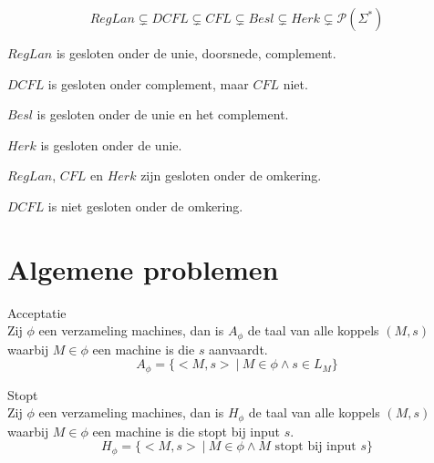 \documentclass[main.tex]{subfiles}
\begin{document}
\begin{st}
  \[ RegLan \subsetneq DCFL \subsetneq CFL \subsetneq Besl \subsetneq Herk \subsetneq \mathcal{P}(\Sigma^{*}) \]
\end{st}

\begin{st}
  $RegLan$ is gesloten onder de unie, doorsnede, complement.
\end{st}

\begin{st}
  $DCFL$ is gesloten onder complement, maar $CFL$ niet. 
\end{st}

\begin{st}
  $Besl$ is gesloten onder de unie en het complement.
\end{st}

\begin{st}
  $Herk$ is gesloten onder de unie.
\end{st}

\begin{st}
  $RegLan$, $CFL$ en $Herk$ zijn gesloten onder de omkering.
\end{st}

\begin{st}
  $DCFL$ is niet gesloten onder de omkering.
\end{st}



\section{Algemene problemen}
\label{sec:algemene-problemen}

\begin{de}
  Acceptatie\\
  Zij $\phi$ een verzameling machines, dan is $A_{\phi}$ de taal van alle koppels $(M,s)$ waarbij $M\in \phi$ een machine is die $s$ aanvaardt.
  \[ A_{\phi} = \{ <M,s> \ |\ M\in \phi \wedge s \in L_{M} \} \]
\end{de}

\begin{de}
  Stopt\\
  Zij $\phi$ een verzameling machines, dan is $H_{\phi}$ de taal van alle koppels $(M,s)$ waarbij $M\in \phi$ een machine is die stopt bij input $s$.
  \[ H_{\phi} = \{ <M,s> \ |\ M \in \phi \wedge M \text{ stopt bij input } s \} \]
\end{de}
\end{document}
